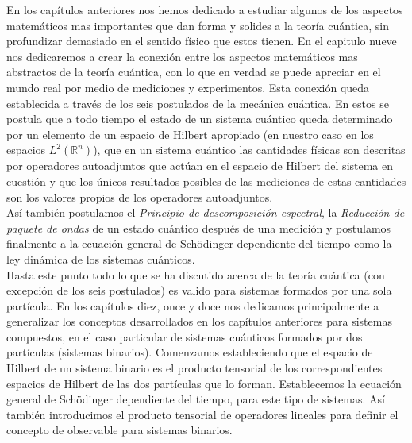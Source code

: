 \documentclass[12pt]{book}
\numberwithin{equation}{chapter}
\def\R{\mathbb{R}}
\begin{document}
En los cap\'itulos anteriores nos hemos dedicado a estudiar algunos de los aspectos matem\'aticos mas importantes que dan forma y solides a la teor\'ia cu\'antica, sin profundizar demasiado en el sentido f\'isico que estos tienen. En el capitulo nueve nos dedicaremos a crear la conexi\'on entre los aspectos matem\'aticos mas abstractos de la teor\'ia cu\'antica, con lo que en verdad se puede apreciar en el mundo real por medio de mediciones y experimentos. Esta conexi\'on queda establecida a trav\'es de los seis postulados de la mec\'anica cu\'antica. En estos se postula que a todo tiempo el estado de un sistema cu\'antico queda determinado por un elemento de un espacio de Hilbert apropiado (en nuestro caso en los espacios $L^{2}(\R^{n})$), que en un sistema cu\'antico las cantidades f\'isicas son descritas por operadores autoadjuntos que act\'uan en el espacio de Hilbert del sistema en cuesti\'on y que los \'unicos resultados posibles de las mediciones de estas cantidades son los valores propios de los operadores autoadjuntos.\\
As\'i tambi\'en postulamos el \emph{Principio de descomposici\'on espectral}, la \emph{Reducci\'on de paquete de ondas} de un estado cu\'antico despu\'es de una medici\'on y postulamos finalmente a la ecuaci\'on general de Sch\"odinger dependiente del tiempo como la ley din\'amica de los sistemas cu\'anticos.\\

Hasta este punto todo lo que se ha discutido acerca de la teor\'ia cu\'antica (con excepci\'on de los seis postulados) es valido para sistemas formados por una sola part\'icula. En los cap\'itulos diez, once y doce nos dedicamos principalmente a generalizar los conceptos desarrollados en los cap\'itulos anteriores para sistemas compuestos, en el caso particular de sistemas cu\'anticos formados por dos part\'iculas (sistemas binarios). Comenzamos estableciendo que el espacio de Hilbert de un sistema binario es el producto tensorial de los correspondientes espacios de Hilbert de las dos part\'iculas que lo forman. Establecemos la ecuaci\'on general de Sch\"odinger dependiente del tiempo, para este tipo de sistemas. As\'i tambi\'en introducimos el producto tensorial de operadores lineales para definir el concepto de observable para sistemas binarios.\\
\end{document}
